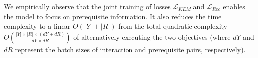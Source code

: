 

We empirically observe that the joint training of losses $\mathcal{L}_{KEM}$ and $\mathcal{L}_{Rec}$ enables the model to focus on prerequisite information.  It also reduces the time complexity to a linear $O(|Y|+|R|)$ from the total quadratic complexity $O(\frac{|Y| \times |R| \times (dY+dR)}{dY \times dR})$ of alternatively executing the two objectives (where $dY$ and $dR$ represent the batch sizes of interaction and prerequisite pairs, respectively).
